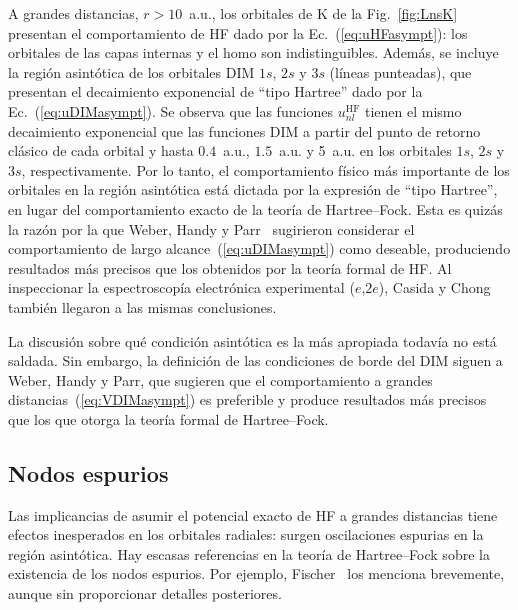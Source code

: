 A grandes distancias, $r>10$~a.u., los orbitales de K de la 
Fig.~\ref{fig:LnsK} presentan el comportamiento de HF dado por la 
Ec.~(\ref{eq:uHFasympt}): los orbitales de las capas internas y el 
\acs{homo} son indistinguibles. Además, se incluye la región asintótica 
de los orbitales DIM $1s$, $2s$ y $3s$ (líneas punteadas), que presentan 
el decaimiento exponencial de ``tipo Hartree'' dado por la 
Ec.~(\ref{eq:uDIMasympt}). Se observa que las funciones 
$u_{nl}^{\mathrm{HF}}$ tienen el mismo decaimiento exponencial que las 
funciones DIM a partir del punto de retorno clásico de cada orbital y 
hasta $0.4$~a.u., $1.5$~a.u. y 5~a.u. en los orbitales $1s$, $2s$ y 
$3s$, respectivamente. Por lo tanto, el comportamiento físico más 
importante de los orbitales en la región asintótica está dictada por la 
expresión de ``tipo Hartree'', en lugar del comportamiento exacto de la 
teoría de Hartree--Fock. Esta es quizás la razón por la que Weber, Handy 
y Parr~\cite{Weber:70} sugirieron considerar el comportamiento de largo 
alcance~(\ref{eq:uDIMasympt}) como deseable, produciendo resultados más 
precisos que los obtenidos por la teoría formal de HF. Al inspeccionar 
la espectroscopía electrónica experimental ($e$,$2e$), Casida y 
Chong~\cite{Casida:89} también llegaron a las mismas conclusiones. 

La discusión sobre qué condición asintótica es la más apropiada todavía 
no está saldada. Sin embargo, la definición de las condiciones de borde 
del DIM siguen a Weber, Handy y Parr, que sugieren que el comportamiento 
a grandes distancias~(\ref{eq:VDIMasympt}) es preferible y produce 
resultados más precisos que los que otorga la teoría formal de 
Hartree--Fock. 

\subsection{Nodos espurios}
\label{subsec:espuriosHF}

Las implicancias de asumir el potencial exacto de HF a grandes 
distancias tiene efectos inesperados en los orbitales radiales: surgen
oscilaciones espurias en la región asintótica. Hay escasas referencias 
en la teoría de Hartree--Fock sobre la existencia de los nodos espurios. 
Por ejemplo, Fischer~\cite{FroeseFischer:97} los menciona brevemente, 
aunque sin proporcionar detalles posteriores. 


